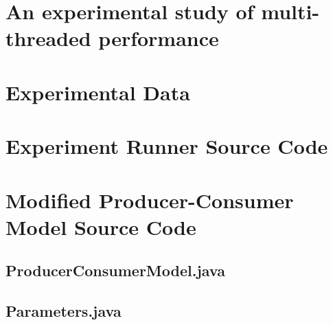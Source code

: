 \documentclass[12pt,a4paper]{article}
\begin{document}
  \section{An experimental study of multi-threaded performance}

  \appendix

  		\section{Experimental Data}

  
		\section{Experiment Runner Source Code}

			

		\section{Modified Producer-Consumer Model Source Code}
			
			\subsection{ProducerConsumerModel.java}

				

			\subsection{Parameters.java}

				
\end{document}
